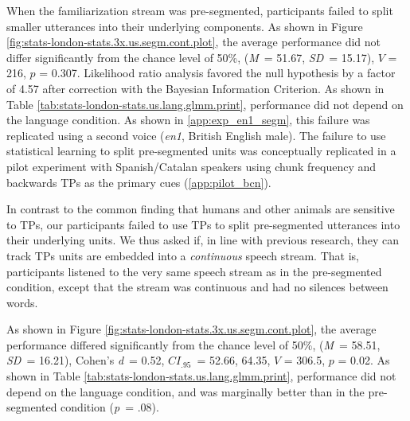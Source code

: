 \documentclass[]{article}
\newcommand{\p}{{\em p\/}}
\newcommand{\M}{{\em M\/}}
\newcommand{\SD}{{\em SD\/}}
\newcommand{\D}{Cohen's {\em d\/}}
\newcommand{\CI}{$CI_{.95}$}
\begin{document}
When the familiarization stream was pre-segmented, participants failed to split smaller utterances into their underlying components. As shown in Figure \ref{fig:stats-london-stats.3x.us.segm.cont.plot}, the average performance did not differ significantly from the chance level of 50\%, (\M~= 51.67, \SD~= 15.17), \(V\) = 216, \(p\) = 0.307. Likelihood ratio analysis favored the null hypothesis by a factor of 4.57 after correction with the Bayesian Information Criterion. As shown in Table \ref{tab:stats-london-stats.us.lang.glmm.print}, performance did not depend on the language condition. As shown in \ref{app:exp_en1_segm}, this failure was replicated using a second voice (\emph{en1}, British English male). The failure to use statistical learning to split pre-segmented units was conceptually replicated in a pilot experiment with Spanish/Catalan speakers using chunk frequency and backwards TPs as the primary cues (\ref{app:pilot_bcn}).


In contrast to the common finding that humans and other animals are sensitive to TPs, our participants failed to use TPs to split pre-segmented utterances into their underlying units. We thus asked if, in line with previous research, they can track TPs units are embedded into a \emph{continuous} speech stream. That is, participants listened to the very same speech stream as in the pre-segmented condition, except that the stream was continuous and had no silences between words.

As shown in Figure \ref{fig:stats-london-stats.3x.us.segm.cont.plot}, the average performance differed significantly from the chance level of 50\%, (\M~= 58.51, \SD~= 16.21), \D~= 0.52, \CI~= 52.66, 64.35, \(V\) = 306.5, \(p\) = 0.02. As shown in Table \ref{tab:stats-london-stats.us.lang.glmm.print}, performance did not depend on the language condition, and was marginally better than in the pre-segmented condition (\p~= .08).

\end{document}
